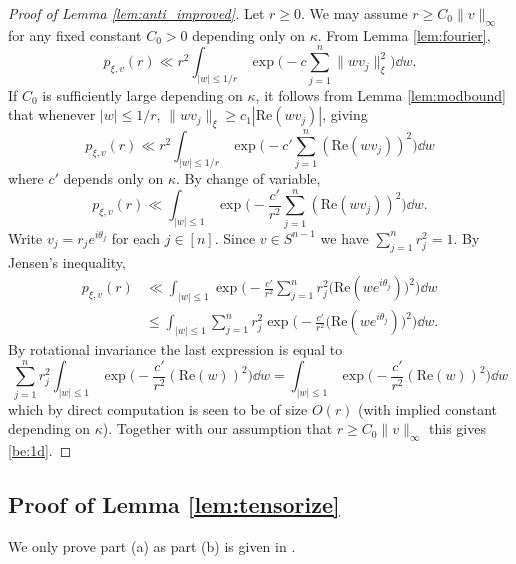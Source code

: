 \documentclass[aop,preprint]{imsart}
\theoremstyle{plain}
\theoremstyle{definition}
\theoremstyle{remark}
\numberwithin{equation}{section}
\numberwithin{theorem}{section}
\def \re {\mathrm{Re}}
\begin{document}
\begin{proof}[Proof of Lemma \ref{lem:anti_improved}]
Let $r\ge0$.
We may assume $r\ge C_0\|v\|_\infty$ for any fixed constant $C_0>0$ depending only on $\kappa$.
From Lemma \ref{lem:fourier}, 
\[
p_{\xi,v}(r) \ll r^2\int_{|w|\le 1/r} \exp\bigg(-c\sum_{j=1}^n \|wv_j\|_\xi^2\bigg)\dd w.
\]
If $C_0$ is sufficiently large depending on $\kappa$, it follows from Lemma \ref{lem:modbound} that whenever $|w|\le 1/r$, $\|wv_j\|_\xi \ge c_1|\re(wv_j)|$, giving
\[
p_{\xi,v}(r) \ll r^2\int_{|w|\le 1/r} \exp\bigg(-c'\sum_{j=1}^n (\re(wv_j))^2\bigg)\dd w
\]
where $c'$ depends only on $\kappa$.
By change of variable,
\begin{equation}	\label{be:cov}
p_{\xi,v}(r) \ll \int_{|w|\le 1} \exp\bigg(-\frac{c'}{r^2}\sum_{j=1}^n (\re(wv_j))^2\bigg)\dd w.
\end{equation}
Write $v_j=r_je^{i\theta_j}$ for each $j\in [n]$.
Since $v\in S^{n-1}$ we have $\sum_{j=1}^n r_j^2=1$. 
By Jensen's inequality,
\begin{align*}
p_{\xi,v}(r) &\ll \int_{|w|\le 1} \exp\bigg( -\frac{c'}{r^2} \sum_{j=1}^n r_j^2\big( \re(we^{i\theta_j})\big)^2\bigg)\dd w \\
&\le \int_{|w|\le 1}\sum_{j=1}^n  r_j^2 \exp\bigg( -\frac{c'}{r^2} \big(\re(we^{i\theta_j})\big)^2\bigg)\dd w.
\end{align*}
By rotational invariance the last expression is equal to
\[
\sum_{j=1}^n  r_j^2\int_{|w|\le 1} \exp\bigg( -\frac{c'}{r^2} (\re(w))^2\bigg)\dd w = \int_{|w|\le 1} \exp\bigg( -\frac{c'}{r^2} (\re(w))^2\bigg)\dd w
\]
which by direct computation is seen to be of size $O(r)$ (with implied constant depending on $\kappa$). 
Together with our assumption that $r\ge C_0\|v\|_\infty$ this gives \eqref{be:1d}.
\end{proof}



\subsection{Proof of Lemma \ref{lem:tensorize}}

We only prove part (a) as part (b) is given in \cite[Lemma 2.2]{RuVe:ilo}.
\end{document}
